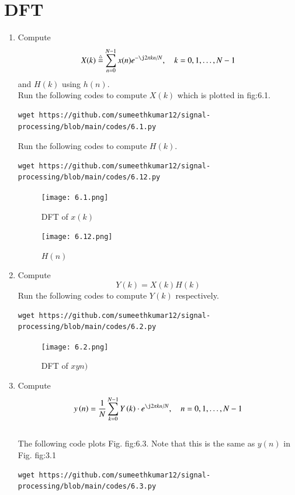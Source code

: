 \documentclass[journal,12pt,twocolumn]{IEEEtran}
\renewcommand\thesection{\arabic{section}}
\begin{document}
\section{DFT }
\begin{enumerate}[label=\thesection.\arabic*]
\item
Compute 
\begin{equation}
X(k) \define \sum _{n=0}^{N-1}x(n) e^{-\j2\pi kn/N}, \quad k = 0,1,\dots, N-1
\end{equation}
and $H(k)$ using $h(n)$.\\
\solution 
Run the following codes to compute $X(k)$ which is plotted in fig:6.1.
\begin{lstlisting}
wget https://github.com/sumeethkumar12/signal-processing/blob/main/codes/6.1.py
\end{lstlisting}
Run the following codes to compute $H(k)$.
\begin{lstlisting}
wget https://github.com/sumeethkumar12/signal-processing/blob/main/codes/6.12.py
\end{lstlisting}
\begin{figure}[!ht]
	\centering
	\texttt{[image: 6.1.png]}
	\caption{DFT of $x(k)$}
	\label{fig:6.1}
\end{figure}
\begin{figure}[!ht]
	\centering
	\texttt{[image: 6.12.png]}
	\caption{$H(n)$}
	\label{fig:6.2}
\end{figure}
\item Compute 
\begin{equation}
Y(k) = X(k)H(k)
\end{equation}
\solution 
Run the following codes to compute $Y(k)$ respectively.
\begin{lstlisting}
wget https://github.com/sumeethkumar12/signal-processing/blob/main/codes/6.2.py
\end{lstlisting}
\begin{figure}[!ht]
	\centering
	\texttt{[image: 6.2.png]}
	\caption{DFT of $xyn)$}
	\label{fig:6.3}
\end{figure}
\item Compute
\begin{equation}
y\brak{n}={\frac {1}{N}}\sum _{k=0}^{N-1}Y\brak{k}\cdot e^{\j 2\pi kn/N},\quad n = 0,1,\dots, N-1
\end{equation}
\\
\solution The following code plots Fig. fig:6.3. Note that this is the same as 
$y(n)$ in  Fig. 
fig:3.1 
%
\begin{lstlisting}
wget https://github.com/sumeethkumar12/signal-processing/blob/main/codes/6.3.py

\end{lstlisting}
\end{enumerate}
\end{document}
